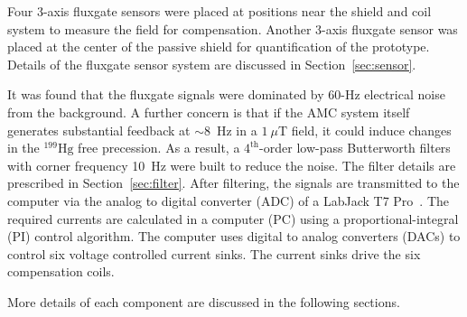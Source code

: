 Four 3-axis fluxgate sensors were placed at positions near the shield and coil system to measure the field for compensation. Another 3-axis fluxgate sensor was placed at the center of the passive shield for quantification of the prototype. Details of the fluxgate sensor system are discussed in Section~\ref{sec:sensor}.




It was found that the fluxgate signals were dominated by 60-Hz electrical noise from the background. A further concern is that if the AMC system itself generates substantial feedback at $\sim8$~Hz in a $1~\mu$T field, it could induce changes in the $\mathrm{^{199}Hg}$ free precession. As a result, a $\mathrm{4^{th}}$-order low-pass Butterworth filters with corner frequency 10~Hz were built to reduce the noise. The filter details are prescribed in Section~\ref{sec:filter}. After filtering, the signals are transmitted to the computer via the analog to digital converter (ADC) of a LabJack T7 Pro~\cite{T7}. The required currents are calculated in a computer (PC) using a proportional-integral (PI) control algorithm. The computer uses digital to analog converters (DACs) to control six voltage controlled current sinks. The current sinks drive the six compensation coils.

More details of each component are discussed in the following sections.

